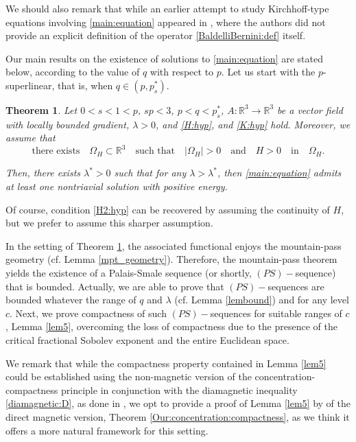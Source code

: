 \documentclass[leqno,11pt]{amsart}
\newcommand{\R}{\mathbb R}
\numberwithin{equation}{section}
\newtheorem{theorem}{Theorem}[section]
\begin{document}
We should also remark that while an earlier attempt to study  Kirchhoff-type equations involving \eqref{main:equation} appeared in  \cite{LiangZhang, ZhaoSongRepovs}, where the authors did not provide an explicit definition of the operator \eqref{BaldelliBernini:def} itself.


Our main results on the existence of solutions to \eqref{main:equation} are stated below, according to the value of $q$ with respect to $p$. Let us start with the $p$-superlinear, that is, when $q \in (p,p^*_s)$.


\begin{theorem}\label{main:theorem:q>p}
Let $0<s<1<p$, $sp<3$, $p<q<p^*_s$, $A:\R^3 \to \R^3$ be a vector field with locally bounded gradient, $\lambda>0$, and \eqref{H:hyp}, and \eqref{K:hyp} hold. 
Moreover, we assume that \begin{equation}\label{H2:hyp}
\text{there exists} \quad\Omega_H\subset\R^3\quad \text{such that} \quad|\Omega_H|>0\quad \text{and} \quad H>0\quad \text{in} \quad\Omega_H.
\end{equation}

Then, there exists $\lambda^*>0$ such that for any $\lambda>\lambda^*$, then \eqref{main:equation} admits at least one nontriavial solution with positive energy.
\end{theorem}



Of course, condition \eqref{H2:hyp} can be recovered by assuming the continuity of $H$, but we prefer to assume this sharper assumption.


In the setting of Theorem \ref{main:theorem:q>p}, the associated functional enjoys the mountain-pass geometry (cf. Lemma \ref{mpt_geometry}). Therefore, the mountain-pass theorem yields the existence of a Palais-Smale sequence (or shortly, $(PS)-$sequence) that is bounded. Actually, we are able to prove that $(PS)-$sequences are bounded whatever the range of $q$ and $\lambda$ (cf. Lemma \ref{lembound}) and for any level $c$. Next, we prove compactness of such $(PS)-$sequences for suitable ranges of $c$, Lemma \ref{lem5}, overcoming the loss of compactness due to the presence of the critical fractional Sobolev exponent and the entire Euclidean space.


We remark that while the compactness property contained in Lemma \ref{lem5} could be established using the non-magnetic  version of the concentration-compactness principle in conjunction with the  diamagnetic inequality \eqref{diamagnetic:D}, as done in \cite{bfk}, we opt to provide a proof of Lemma \ref{lem5} by of the direct magnetic version, Theorem \ref{Our:concentration:compactness}, as we think it offers a more natural framework for this setting.
\end{document}
